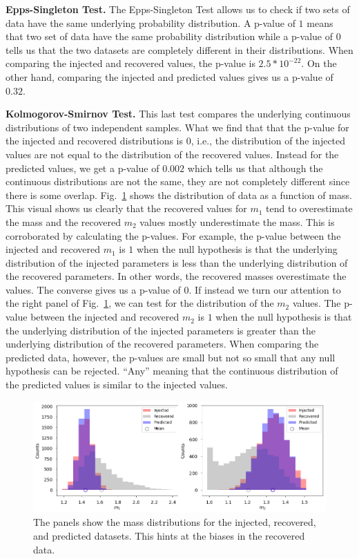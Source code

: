 \documentclass[aps,prd,twocolumn,superscriptaddress,preprintnumbers,floatfix,nofootinbib]{revtex4-2}
\begin{document}
\textbf{Epps-Singleton Test.} The Epps-Singleton Test allows us to check if two 
sets of data have the same underlying probability distribution. A p-value of $1$ means 
that two set of data have the same probability distribution while a p-value of $0$ tells us 
that the two datasets are completely different in their distributions. When comparing the 
injected and recovered values, the p-value is $2.5*10^{-22}$. On the other hand, comparing 
the injected and predicted values gives us a p-value of $0.32$. 

\textbf{Kolmogorov-Smirnov Test.} This last test compares the underlying continuous 
distributions of two independent samples. What we find that that the p-value for the 
injected and recovered distributions is $0$, i.e., the distribution of the injected values are 
not equal to the distribution of the recovered values. Instead for the predicted values, we get 
a p-value of $0.002$ which tells us that although the continuous distributions are not the 
same, they are not completely different since there is some overlap. Fig.~\ref{fig:ks_test} 
shows the distribution of data as a function of mass. This visual shows us clearly that the 
recovered values for $m_1$ tend to overestimate the mass and the recovered $m_2$ 
values mostly underestimate the mass. This is corroborated by calculating the p-values. 
For example, the p-value between the injected and recovered $m_1$ is $1$ when the 
null hypothesis is that the underlying distribution of the injected parameters is less than 
the underlying distribution of the recovered parameters. In other words, the recovered 
masses overestimate the values. The converse gives us a p-value of $0$. If instead we turn 
our attention to the right panel of Fig.~\ref{fig:ks_test}, we can test for the distribution of 
the $m_2$ values. The p-value between the injected and recovered $m_2$ is $1$ when the 
null hypothesis is that the underlying distribution of the injected parameters is greater than 
the underlying distribution of the recovered parameters. When comparing the predicted data, 
however, the p-values are small but not so small that any null hypothesis can be rejected. 
``Any'' meaning that the continuous distribution of the predicted values is similar to the 
injected values.
\begin{figure}[t]
  \centering
  \includegraphics[width=\linewidth]{KS_test}
  \caption{The panels show the mass distributions for the injected, recovered, and predicted 
  		datasets. This hints at the biases in the recovered data.}
  \label{fig:ks_test}
\end{figure}
\end{document}
